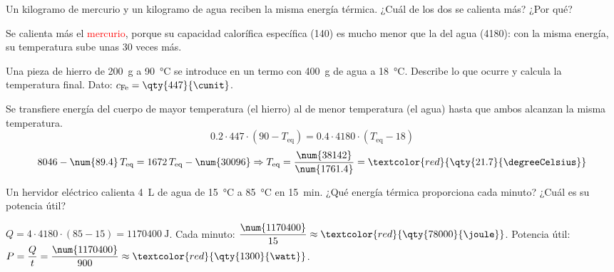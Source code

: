 \begin{exercise}
    Un kilogramo de mercurio y un kilogramo de agua reciben la misma energía térmica. ¿Cuál de los dos se calienta más? ¿Por qué?
    \begin{solu}
        Se calienta más el \textcolor{red}{mercurio}, porque su capacidad calorífica específica (\qty{140}{\cunit}) es mucho menor que la del agua (\qty{4180}{\cunit}): con la misma energía, su temperatura sube unas 30 veces más.
    \end{solu}
\end{exercise}

\begin{exercise}
    Una pieza de hierro de \qty{200}{\gram} a \qty{90}{\degreeCelsius} se introduce en un termo con \qty{400}{\gram} de agua a \qty{18}{\degreeCelsius}. Describe lo que ocurre y calcula la temperatura final. Dato: \(c_{\text{Fe}} = \qty{447}{\cunit}\).
    \begin{solu}
        Se transfiere energía del cuerpo de mayor temperatura (el hierro) al de menor temperatura (el agua) hasta que ambos alcanzan la misma temperatura.
        \[ \num{0.2} \cdot 447 \cdot (90 - T_{\text{eq}}) = \num{0.4} \cdot 4180 \cdot (T_{\text{eq}} - 18) \]
        \[ 8046 - \num{89.4}\,T_{\text{eq}} = 1672\,T_{\text{eq}} - \num{30096} \Rightarrow T_{\text{eq}} = \frac{\num{38142}}{\num{1761.4}} = \textcolor{red}{\qty{21.7}{\degreeCelsius}} \]
    \end{solu}
\end{exercise}

\begin{exercise}
    Un hervidor eléctrico calienta \qty{4}{\liter} de agua de \qty{15}{\degreeCelsius} a \qty{85}{\degreeCelsius} en \qty{15}{\minute}. ¿Qué energía térmica proporciona cada minuto? ¿Cuál es su potencia útil?
    \begin{solu}
        \(Q = 4 \cdot 4180 \cdot (85 - 15) = \qty{1170400}{\joule}\). Cada minuto: \(\dfrac{\num{1170400}}{15} \approx \textcolor{red}{\qty{78000}{\joule}}\). Potencia útil: \(P = \dfrac{Q}{t} = \dfrac{\num{1170400}}{900} \approx \textcolor{red}{\qty{1300}{\watt}}\).
    \end{solu}
\end{exercise}

